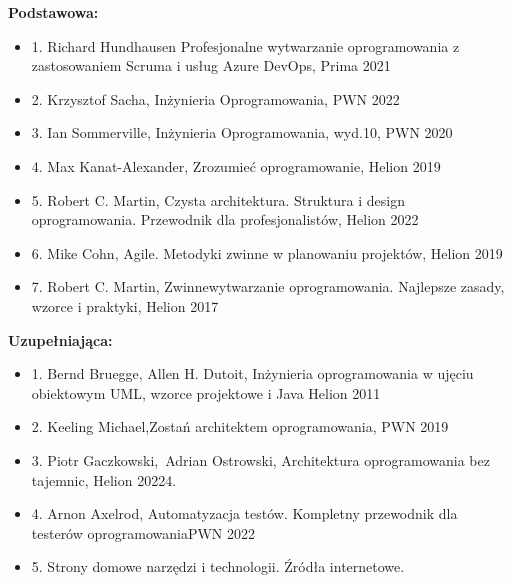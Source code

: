 \documentclass[12pt, a4paper]{article}
\begin{document}
\textbf{Podstawowa:}
\begin{itemize}
  \item 1. Richard Hundhausen  Profesjonalne wytwarzanie oprogramowania z zastosowaniem Scruma i usług Azure DevOps, Prima 2021
  \item 2. Krzysztof Sacha,  Inżynieria Oprogramowania, PWN 2022
  \item 3. Ian Sommerville,  Inżynieria Oprogramowania, wyd.10, PWN 2020
  \item 4. Max Kanat-Alexander, Zrozumieć oprogramowanie, Helion 2019
  \item 5. Robert C. Martin, Czysta architektura. Struktura i design oprogramowania. Przewodnik dla profesjonalistów, Helion 2022
  \item 6. Mike Cohn, Agile. Metodyki zwinne w planowaniu projektów, Helion 2019
  \item 7. Robert C. Martin, Zwinnewytwarzanie oprogramowania. Najlepsze zasady, wzorce i praktyki, Helion 2017
\end{itemize}

\textbf{Uzupełniająca:}
\begin{itemize}
  \item 1. Bernd Bruegge,  Allen H. Dutoit, Inżynieria oprogramowania w ujęciu obiektowym UML, wzorce projektowe i Java Helion 2011
  \item 2. Keeling Michael,Zostań architektem oprogramowania, PWN 2019
  \item 3. Piotr Gaczkowski, Adrian Ostrowski, Architektura oprogramowania bez tajemnic, Helion 20224.
  \item 4. Arnon Axelrod, Automatyzacja testów. Kompletny przewodnik dla testerów oprogramowaniaPWN 2022
  \item 5. Strony domowe narzędzi i technologii. Źródła internetowe.
\end{itemize}
\end{document}
